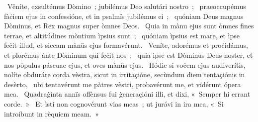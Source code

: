 ~Věníte, exsultémus Dòmino~; jubilémus Deo salutári nostro~; 
~praeoccupémus fàċiem ejus in confessióne, et in psalmïs jubilémus ei~; 
~quóniam Deus magnus Dòminus, et Rex magnus super òmnes Deos. 
~Quia in mànu ejus sunt òmnes fines terrae, et altitúdines mòntium ìpsius sunt~; 
~quóniam ìpsius est mare, et ìpse feċit illud, et siccam mànüs ejus formavérunt. 
~Veníte, adorémus et proċidámus, et plorémus ànte Dòminum qui feċit nos~; 
~quia ìpse est Dòminus Deus noster, et nos pòpulus páscuae ejus, et oves mànüs ejus. 
~Hódie si voċem ejus audiverítis, nolíte obduráre corda vèstra, sicut in irritaçióne, secùndum diem tentaçiónis in desèrto, 
~ubi tentavérunt me pàtres vèstri, probavérunt me, et vïdérunt ópera mea. 
~Quadraġìnta annïs offènsus fui ġeneraçióni illi, et dixi, «~Semper hi errant corde.~»
~Et ìsti non cognovérunt vias meas~; ut jurávi in ira mea, «~Si introíbunt in rèquiem meam.~»
